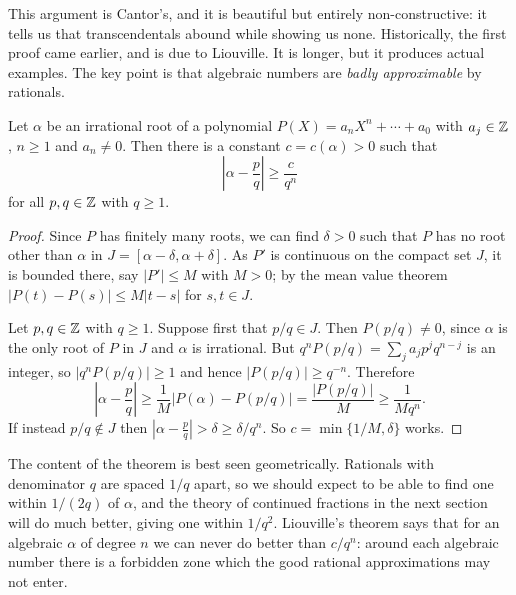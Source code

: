 \documentclass[a4paper]{scrartcl}
\begin{document}
This argument is Cantor's, and it is beautiful but entirely non-constructive: it tells us that transcendentals abound while showing us none. Historically, the first proof came earlier, and is due to Liouville. It is longer, but it produces actual examples. The key point is that algebraic numbers are \emph{badly approximable} by rationals.

\begin{theorem}[Liouville]\label{thm:liouville}
	Let $\alpha$ be an irrational root of a polynomial $P(X) = a_nX^n+\cdots+a_0$ with $a_j\in\mathbb{Z}$, $n\geq1$ and $a_n\neq0$. Then there is a constant $c = c(\alpha)>0$ such that
	$$\left|\alpha-\frac pq\right| \geq \frac{c}{q^n}$$
	for all $p,q\in\mathbb{Z}$ with $q\geq1$.
\end{theorem}

\begin{proof}
	Since $P$ has finitely many roots, we can find $\delta>0$ such that $P$ has no root other than $\alpha$ in $J = [\alpha-\delta,\alpha+\delta]$. As $P'$ is continuous on the compact set $J$, it is bounded there, say $|P'|\leq M$ with $M > 0$; by the mean value theorem $|P(t)-P(s)|\leq M|t-s|$ for $s,t\in J$.

	Let $p,q\in\mathbb{Z}$ with $q\geq1$. Suppose first that $p/q \in J$. Then $P(p/q)\neq0$, since $\alpha$ is the only root of $P$ in $J$ and $\alpha$ is irrational. But $q^nP(p/q) = \sum_j a_jp^jq^{n-j}$ is an integer, so $|q^nP(p/q)|\geq1$ and hence $|P(p/q)|\geq q^{-n}$. Therefore
	$$\left|\alpha - \frac pq\right| \geq \frac{1}{M}\left|P(\alpha)-P(p/q)\right| = \frac{|P(p/q)|}{M} \geq \frac{1}{Mq^n}.$$
	If instead $p/q\notin J$ then $\left|\alpha - \frac pq\right| > \delta \geq \delta/q^n$. So $c = \min\{1/M,\delta\}$ works.
\end{proof}

The content of the theorem is best seen geometrically. Rationals with denominator $q$ are spaced $1/q$ apart, so we should expect to be able to find one within $1/(2q)$ of $\alpha$, and the theory of continued fractions in the next section will do much better, giving one within $1/q^2$. Liouville's theorem says that for an algebraic $\alpha$ of degree $n$ we can never do better than $c/q^n$: around each algebraic number there is a forbidden zone which the good rational approximations may not enter.
\end{document}

